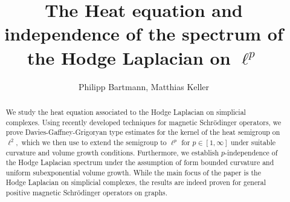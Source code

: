 \documentclass[10pt]{amsart}
\theoremstyle{definition}
\begin{document}
	\author[P. Bartmann, M. Keller]{Philipp Bartmann, Matthias Keller}
	
	\address{Philipp Bartmann: Institut f\"ur Mathematik, Universit\"at Potsdam
		14476  Potsdam, Germany}

    \address{Matthias Keller: Israel Institute of Advanced Studies (IIAS) The Hebrew University of Jerusalem, Feldman bldg. Edmond J. Safra Campus, Givat Ram, Jerusalem, Israel;
    Institut f\"ur Mathematik, Universit\"at Potsdam
		14476  Potsdam, Germany}
	
	
	
	\title[]{The Heat equation and independence of the spectrum of the Hodge Laplacian on $\ell^p$}
	

\begin{abstract}
We study the heat equation associated to the Hodge Laplacian on simplicial complexes. Using recently developed techniques for magnetic Schrödinger operators, we prove Davies-Gaffney-Grigoryan type estimates for the kernel of the heat semigroup on $\ell^2,$ which we then use to extend the  semigroup to $\ell^p$ for $p\in[1,\infty]$ under suitable curvature and volume growth conditions. Furthermore, we establish $p$-independence of the Hodge Laplacian spectrum under the assumption of form bounded curvature and uniform subexponential volume growth. While the main focus of the paper is the Hodge Laplacian on simplicial complexes, the results are indeed proven for general positive magnetic Schrödinger operators on graphs.
  
\end{abstract}
\maketitle
\tableofcontents
\end{document}
